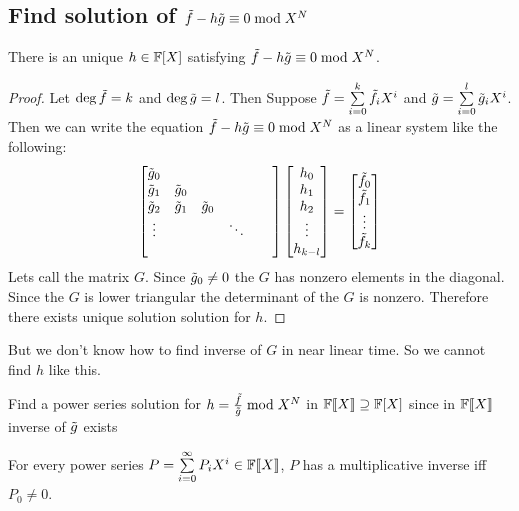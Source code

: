 \subsection{Find solution of \texorpdfstring{$\tilde{f}-h\tilde{g}\equiv 0\bmod {X^N}$}{f-fg=0 mod X\^N}}
\begin{algoprob}
\end{algoprob}
\begin{lemma}{}{}
	There is an unique $h\in\mathbb{F}[X]$ satisfying $\tilde{f}-h\tilde{g}\equiv 0\bmod{X^N}$.
\end{lemma}
\begin{proof}
	Let $\deg \tilde{f}=k$ and $\deg\tilde{g}=l$. Then Suppose $\tilde{f}=\sum\limits_{i=0}^k\tilde{f}_iX^i$ and $\tilde{g}=\sum\limits_{i=0}^l\tilde{g}_iX^i$. Then we can write the equation  $\tilde{f}-h\tilde{g}\equiv 0\bmod{X^N}$ as a linear system like the following: $$\left[\begin{matrix}\tilde{g}_0 & \\ \tilde{g}_1 & \tilde{g}_0&\\ \tilde{g}_2&\tilde{g}_1&\tilde{g}_0 & \\ \vdots
		& & & \ddots & \\ & & & & &\end{matrix}\right]\left[\begin{matrix}h_0\\ h_1 \\ h_2\\ \vdots \\ h_{k-l}\end{matrix}\right]=\left[\begin{matrix}\tilde{f}_0\\ \tilde{f}_1\\ \vdots \\ \tilde{f}_k\end{matrix}\right]$$Lets call the matrix $G$. Since $\tilde{g}_0\neq 0$ the $G$ has nonzero elements in the diagonal. Since the $G$ is lower triangular the determinant of the $G$ is nonzero. Therefore there exists unique solution solution for $h$.
\end{proof}

But we don't know how to find inverse of $G$ in near linear time. So we cannot find $h$ like this.
\begin{idea*}
	Find a power series solution for $h=\frac{\tilde{f}}{\tilde{g}}\bmod {X^N}$ in $\mathbb{F}\llbracket X\rrbracket\supseteq \mathbb{F}[X]$ since in $\mathbb{F}\llbracket X\rrbracket$ inverse of $\tilde{g}$ exists
\end{idea*}
\begin{lemma}{}{}
	For every power series $P=\sum\limits_{i=0}^{\infty}P_iX^i\in\mathbb{F}\llbracket X\rrbracket$, $P$ has a multiplicative inverse iff $P_0\neq 0$.
\end{lemma}

